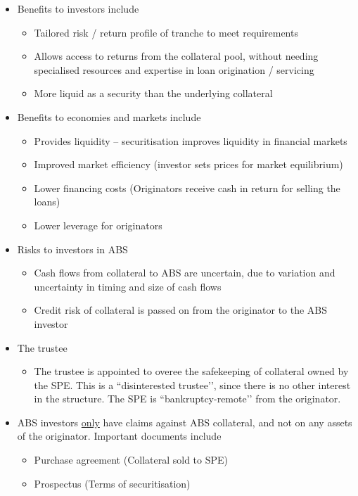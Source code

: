 \documentclass[../notes_compiled.tex]{subfiles}
\begin{document}
\begin{itemize}
\item Benefits to investors include
\begin{itemize}
\item Tailored risk / return profile of tranche to meet requirements
\item Allows access to returns from the collateral pool, without needing specialised resources and expertise in loan origination / servicing
\item More liquid as a security than the underlying collateral
\end{itemize}

\item Benefits to economies and markets include
\begin{itemize}
\item Provides liquidity -- securitisation improves liquidity in financial markets
\item Improved market efficiency (investor sets prices for market equilibrium)
\item Lower financing costs (Originators receive cash in return for selling the loans)
\item Lower leverage for originators
\end{itemize}

\item Risks to investors in ABS
\begin{itemize}
\item Cash flows from collateral to ABS are uncertain, due to variation and uncertainty in timing and size of cash flows
\item Credit risk of collateral is passed on from the originator to the ABS investor
\end{itemize}

\item The trustee
\begin{itemize}
\item The trustee is appointed to overee the safekeeping of collateral owned by the SPE. This is a ``disinterested trustee’’, since there is no other interest in the structure. The SPE is ``bankruptcy-remote’’ from the originator.
\end{itemize}

\item ABS investors \underline{only} have claims against ABS collateral, and not on any assets of the originator. Important documents include
\begin{itemize}
\item Purchase agreement (Collateral sold to SPE)
\item Prospectus (Terms of securitisation)
\end{itemize}


\end{itemize}
\end{document}
